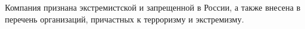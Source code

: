 
Компания признана экстремистской и запрещенной в России, а также внесена в перечень организаций, причастных к терроризму и экстремизму.
